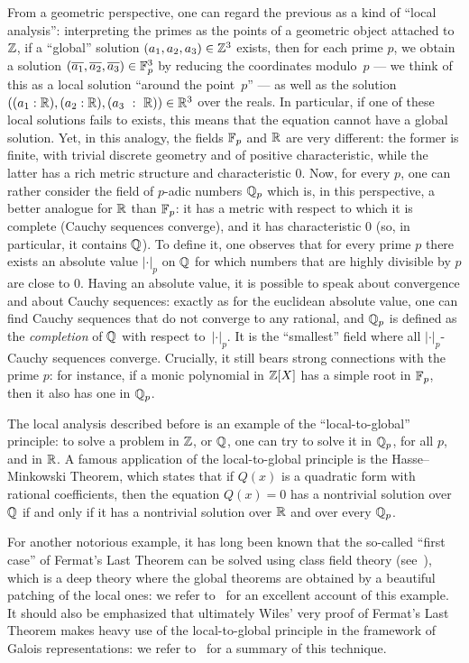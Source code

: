 \documentclass[sigplan,screen]{acmart}
\begin{document}
From a geometric perspective, one can regard the previous as a kind of ``local analysis'': interpreting the primes as the points of a geometric object attached to $\mathbb{Z}$, if a ``global'' solution $(a_1,a_2,a_3)\in\mathbb{Z}^3$ exists, then for each prime $p$, we obtain a solution $(\overline{a_1},\overline{a_2},\overline{a_3})\in\mathbb{F}_{p}^3$ by reducing the coordinates modulo~$p$ --- we think of this as a local solution ``around the point~$p$'' --- as well as the solution  $((a_1 : \mathbb{R}),(a_2 : \mathbb{R}),(a_3~:~\mathbb{R}))\in\mathbb{R}^3$ over the reals. In particular, if one of these local solutions fails to exists, this means that the equation cannot have a global solution. Yet, in this analogy, the fields $\mathbb{F}_{p}$ and $\mathbb{R}$ are very different: the former is finite, with trivial discrete geometry and of positive characteristic, while the latter has a rich metric structure and characteristic $0$. Now, for every $p$, one can rather consider the field of $p$-adic numbers $\mathbb{Q}_p$ which is, in this perspective, a better analogue for $\mathbb{R}$ than $\mathbb{F}_{p}$: it has a metric with respect to which it is complete (Cauchy sequences converge), and it has characteristic $0$ (so, in particular, it contains $\mathbb{Q}$). To define it, one observes that for every prime $p$ there exists an absolute value $\lvert\cdot\rvert_p$ on $\mathbb{Q}$ for which numbers that are highly divisible by $p$ are close to $0$. Having an absolute value, it is possible to speak about convergence and about Cauchy sequences: exactly as for the euclidean absolute value, one can find Cauchy sequences that do not converge to any rational, and $\mathbb{Q}_p$ is defined as the \emph{completion} of $\mathbb{Q}$ with respect to~$\lvert\cdot\rvert_p$. It is the ``smallest'' field where all $\lvert\cdot\rvert_p$-Cauchy sequences converge. Crucially, it still bears strong connections with the prime $p$: for instance, if a monic polynomial in $\mathbb{Z}[X]$ has a simple root in $\mathbb{F}_{p}$, then it also has one in $\mathbb{Q}_p$. 

The local analysis described before is an example of the ``local-to-global'' principle: to solve a problem in $\mathbb{Z}$, or $\mathbb{Q}$, one can try to solve it in $\mathbb{Q}_p$, for all $p$, and in $\mathbb{R}$. A famous application of the local-to-global principle is the Hasse–Minkowski Theorem, which states that if $Q(x)$ is a quadratic form with rational coefficients, then the equation $Q(x)=0$ has a nontrivial solution over $\mathbb{Q}$ if and only if it has a nontrivial solution over $\mathbb{R}$ and over every $\mathbb{Q}_p$.

For another notorious example, it has long been known that the so-called ``first case'' of Fermat's Last Theorem can be solved using class field theory (see~\cite{LenSte97}), which is a deep theory where the global theorems are obtained by a beautiful patching of the local ones: we refer to \cite{Tat67}~for an excellent account of this example. It should also be emphasized that ultimately Wiles' very proof of Fermat's Last Theorem makes heavy use of the local-to-global principle in the framework of Galois representations: we refer to~\cite{Fre09} for a summary of this technique.
\end{document}
